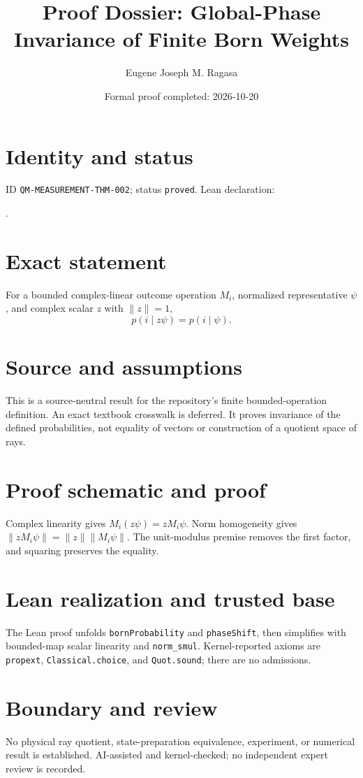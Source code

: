\documentclass[11pt]{article}
\title{Proof Dossier: Global-Phase Invariance of Finite Born Weights}\author{Eugene Joseph M. Ragasa}\date{Formal proof completed: 2026-10-20}
\begin{document}
\maketitle
\section{Identity and status}
ID \texttt{QM-MEASUREMENT-THM-002}; status \texttt{proved}. Lean declaration:
\par{}.
\section{Exact statement}
For a bounded complex-linear outcome operation $M_i$, normalized representative $\psi$, and
complex scalar $z$ with $\lVert z\rVert=1$,
\[p(i\mid z\psi)=p(i\mid\psi).\]
\section{Source and assumptions}
This is a source-neutral result for the repository's finite bounded-operation definition. An exact
textbook crosswalk is deferred. It proves invariance of the defined probabilities, not equality of
vectors or construction of a quotient space of rays.
\section{Proof schematic and proof}
Complex linearity gives $M_i(z\psi)=zM_i\psi$. Norm homogeneity gives
$\lVert zM_i\psi\rVert=\lVert z\rVert\lVert M_i\psi\rVert$. The unit-modulus premise removes the
first factor, and squaring preserves the equality.
\section{Lean realization and trusted base}
The Lean proof unfolds \texttt{bornProbability} and \texttt{phaseShift}, then simplifies with
bounded-map scalar linearity and \texttt{norm\_smul}. Kernel-reported axioms are
\texttt{propext}, \texttt{Classical.choice}, and \texttt{Quot.sound}; there are no admissions.
\section{Boundary and review}
No physical ray quotient, state-preparation equivalence, experiment, or numerical result is
established. AI-assisted and kernel-checked; no independent expert review is recorded.
\end{document}
